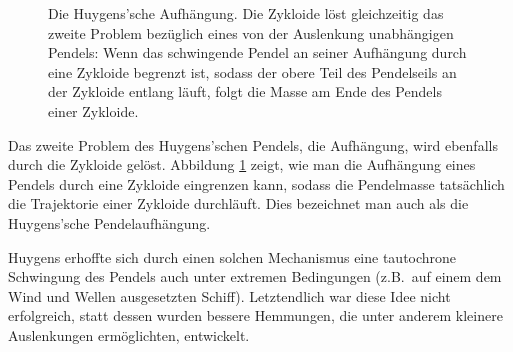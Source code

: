 \begin{figure}
\caption{\label{fig_Zykloide2}%
Die Huygens'sche Aufh\"an\-gung. Die Zykloide l\"ost gleichzeitig das zweite Problem bez\"uglich eines
von der Auslenkung unabh\"angigen Pendels: Wenn das schwingende Pendel an seiner Aufh\"angung
durch eine Zykloide begrenzt ist, sodass der obere Teil des Pendelseils an der Zykloide entlang
l\"auft, folgt die Masse am Ende des Pendels einer Zykloide.} 
\end{figure}

Das zweite Problem des Huygens'schen Pendels, die Aufh\"angung, wird ebenfalls durch die Zykloide
gel\"ost. 
Abbildung \ref{fig_Zykloide2} zeigt, wie man die Aufh\"angung eines Pendels durch eine Zykloide
eingrenzen kann, sodass die Pendelmasse tats\"achlich die Trajektorie einer Zykloide durchl\"auft. 
Dies bezeichnet man auch als die Huygens'sche Pendelaufh\"angung.


Huygens erhoffte sich durch einen solchen Mechanismus
eine tautochrone Schwingung des Pendels auch unter extremen Bedingungen (z.B.\ auf einem
dem Wind und Wellen ausgesetzten Schiff). Letztendlich war diese Idee nicht erfolgreich, statt dessen wurden bessere
Hemmungen, die unter anderem kleinere Auslenkungen erm\"oglichten, entwickelt. 

